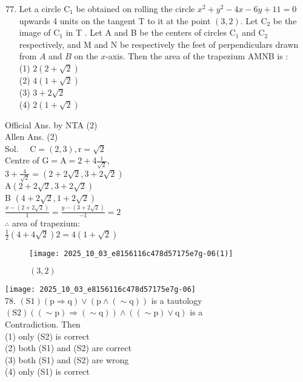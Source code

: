 \documentclass[10pt]{article}
\begin{document}
\begin{enumerate}
  \setcounter{enumi}{76}
  \item Let a circle \(\mathrm{C}_{1}\) be obtained on rolling the circle \(x^{2}+y^{2}-4 x-6 y+11=0\) upwards 4 units on the tangent T to it at the point \((3,2)\). Let \(\mathrm{C}_{2}\) be the image of \(\mathrm{C}_{1}\) in T . Let A and B be the centers of circles \(\mathrm{C}_{1}\) and \(\mathrm{C}_{2}\) respectively, and M and N be respectively the feet of perpendiculars drawn from \(A\) and \(B\) on the \(x\)-axis. Then the area of the trapezium AMNB is :\\
(1) \(2(2+\sqrt{2})\)\\
(2) \(4(1+\sqrt{2})\)\\
(3) \(3+2 \sqrt{2}\)\\
(4) \(2(1+\sqrt{2})\)
\end{enumerate}

Official Ans. by NTA (2)\\
Allen Ans. (2)\\
Sol. \(\quad \mathrm{C}=(2,3), \mathrm{r}=\sqrt{2}\)\\
Centre of \(\mathrm{G}=\mathrm{A}=2+4 \frac{1}{\sqrt{2}}\),\\
\(3+\frac{4}{\sqrt{2}}=(2+2 \sqrt{2}, 3+2 \sqrt{2})\)\\
\(\mathrm{A}(2+2 \sqrt{2}, 3+2 \sqrt{2})\)\\
B \((4+2 \sqrt{2}, 1+2 \sqrt{2})\)\\
\(\frac{x-(2+2 \sqrt{2})}{1}=\frac{y-(3+2 \sqrt{2})}{-1}=2\)\\
\(\therefore\) area of trapezium:\\
\(\frac{1}{2}(4+4 \sqrt{2}) 2=4(1+\sqrt{2})\)

\begin{figure}[h]
\begin{center}
  \texttt{[image: 2025\_10\_03\_e8156116c478d57175e7g-06(1)]}
\captionsetup{labelformat=empty}
\caption{\((3,2)\)}
\end{center}
\end{figure}

\texttt{[image: 2025\_10\_03\_e8156116c478d57175e7g-06]}\\
78. \((\mathrm{S} 1)(\mathrm{p} \Rightarrow \mathrm{q}) \vee(\mathrm{p} \wedge(\sim \mathrm{q}))\) is a tautology\\
\((\mathrm{S} 2)((\sim \mathrm{p}) \Rightarrow(\sim \mathrm{q})) \wedge((\sim \mathrm{p}) \vee \mathrm{q})\) is a\\
Contradiction. Then\\
(1) only (S2) is correct\\
(2) both (S1) and (S2) are correct\\
(3) both (S1) and (S2) are wrong\\
(4) only (S1) is correct
\end{document}
